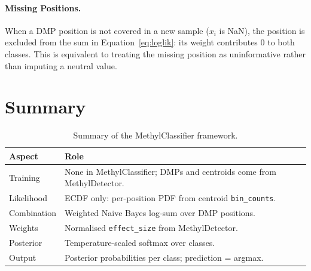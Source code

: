\documentclass[11pt]{article}
\begin{document}
\paragraph{Missing Positions.}

When a DMP position is not covered in a new sample (\(x_i\) is NaN), the
position is excluded from the sum in Equation~\eqref{eq:loglik}: its weight
contributes \(0\) to both classes.  This is equivalent to treating the
missing position as uninformative rather than imputing a neutral value.

\section{Summary}

\begin{table}[h]
\centering
\begin{tabular}{@{}ll@{}}
\toprule
Aspect & Role \\
\midrule
Training & None in MethylClassifier; DMPs and centroids come from MethylDetector. \\
Likelihood & ECDF only: per-position PDF from centroid \texttt{bin\_counts}. \\
Combination & Weighted Naive Bayes log-sum over DMP positions. \\
Weights & Normalised \texttt{effect\_size} from MethylDetector. \\
Posterior & Temperature-scaled softmax over classes. \\
Output & Posterior probabilities per class; prediction = argmax. \\
\bottomrule
\end{tabular}
\caption{Summary of the MethylClassifier framework.}
\end{table}
\end{document}
